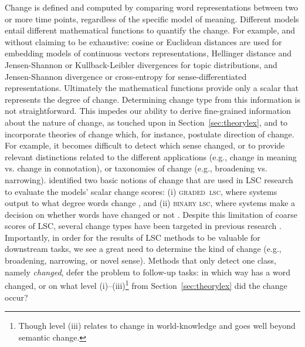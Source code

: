 \documentclass[output=paper]{langscibook}
\begin{document}
Change is defined and computed by comparing word representations between two or more time points, regardless of the specific model of meaning. 
Different models entail different mathematical functions to quantify the change. For example, and without claiming to be exhaustive: cosine or Euclidean distances are used for embedding models of continuous vectors representations, Hellinger distance and Jensen-Shannon or Kullback-Leibler divergences for topic distributions, and Jensen-Shannon divergence or cross-entropy for sense-differentiated representations. Ultimately the mathematical functions provide only a scalar that represents the degree of change. Determining change type from this information is not straightforward.
This impedes our ability to derive fine-grained information about the nature of change, as touched upon in Section~\ref{sec:theorylex}, and to incorporate theories of change which, for instance, postulate direction of change. 
For example, it becomes difficult to detect which sense changed, or to provide relevant distinctions related to the different applications (e.g., change in meaning vs. change in connotation), or taxonomies of change (e.g., broadening vs. narrowing). 
 \citet{schlechtwegwalde20} identified two basic notions of change that are used in LSC research to evaluate the models' scalar change scores: (i) \textsc{graded~lsc}, where systems output to what degree words change \citep{hamilton-etal-2016-cultural,dubossarsky-etal-2017-outta,bamler17,rosenfeld-erk-2018-deep,rudolphb18-dynamicembforlangevo,schlechtweg2018durel}, and (ii) \textsc{binary lsc}, where systems make a decision on whether words have changed or not \citep{cook-etal-2014-novel,tahmasebi-ranlp17,perrone-etal-2019-gasc,shoemark-etal-2019-room}. 
Despite this limitation of coarse scores of LSC, several change types have been targeted in previous research \citep[][Table 4]{tahmasebi2018survey}. Importantly, in order for the results of LSC methods to be valuable for downstream tasks, we see a great need to determine the kind of change (e.g., broadening, narrowing, or novel sense). Methods that only detect one class, namely \textit{changed}, defer the problem to follow-up tasks: in which way has a word changed, or on what level (i)--(iii)\footnote{Though level (iii) relates to change in world-knowledge and goes well beyond semantic change.} from Section~\ref{sec:theorylex} did the change occur?
\end{document}
